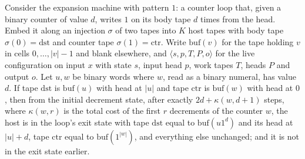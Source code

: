 \begin{theorem}
\label{Turing.NTimeDiag.qy_expandHost}
\leanok
{}
Consider the expansion machine with pattern $1$: a counter loop that, given a binary counter of
value $d$, writes $1$ on its body tape $d$ times from the head. Embed it along an injection
$\sigma$ of two tapes into $K$ host tapes with body tape $\sigma(0) = \mathrm{dst}$ and counter
tape $\sigma(1) = \mathrm{ctr}$. Write $\mathrm{buf}(v)$ for the tape holding $v$ in cells
$0, \dots, |v| - 1$ and blank elsewhere, and $\langle s, p, T, P, o\rangle$ for the live
configuration on input $x$ with state $s$, input head $p$, work tapes $T$, heads $P$ and output
$o$. Let $u, w$ be binary words where $w$, read as a binary numeral, has value $d$. If tape
$\mathrm{dst}$ is $\mathrm{buf}(u)$ with head at $|u|$ and tape $\mathrm{ctr}$ is
$\mathrm{buf}(w)$ with head at $0$, then from the initial decrement state, after exactly
$2d + \kappa(w, d + 1)$ steps, where $\kappa(w, r)$ is the total cost of the first $r$ decrements
of the counter $w$, the host is in the loop's exit state with tape $\mathrm{dst}$ equal to
$\mathrm{buf}(u 1^d)$ and its head at $|u| + d$, tape $\mathrm{ctr}$ equal to
$\mathrm{buf}(1^{|w|})$, and everything else unchanged; and it is not in the exit state earlier.
\end{theorem}

